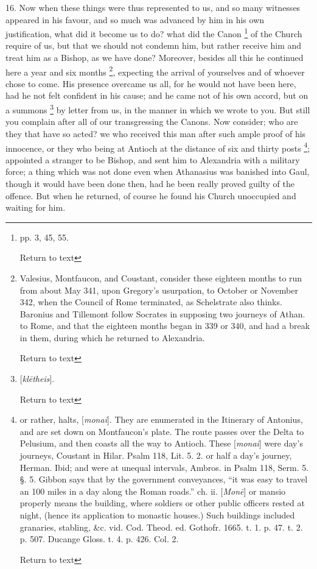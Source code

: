 16. Now when these things were thus represented
to us, and so many witnesses appeared in his favour, and so much was
advanced by him in his own justification, what did it become us to do?
what did the Canon \footnote{pp. 3, 45, 55.

Return to text}
of the Church require of us, but that we should not condemn him, but
rather receive him and treat him as a Bishop, as we have done?
Moreover, besides all this he continued here a year and six months \footnote{Valesius, Montfaucon, and Coustant, consider these eighteen months to
run from about May 341, upon Gregory's usurpation, to October or
November 342, when the Council of Rome terminated, as Schelstrate also
thinks. Baronius and Tillemont follow Socrates in supposing two
journeys of Athan. to Rome, and that the eighteen months began in 339
or 340, and had a break in them, during which he returned to
Alexandria.

Return to text}, expecting the arrival of yourselves and of whoever chose to
come. His presence overcame us all, for he would not have been here,
had he not felt confident in his cause; and he came not of his own
accord, but on a summons \footnote{[\emph{kl\={e}theis}].

Return to text}
by letter from us, in the manner in which we wrote to you. But
still you complain after all of our transgressing the Canons. Now
consider; who are they that have so acted? we who received this man
after such ample proof of his innocence, or they who being at Antioch
at the distance of six and thirty posts \footnote{or rather, halts, [\emph{monai}]. They are enumerated in the Itinerary
of Antonius, and are set down on Montfaucon's plate. The route passes
over the Delta to Pelusium, and then coasts all the way to Antioch.
These [\emph{monai}] were day's journeys, Coustant in Hilar. Psalm
118, Lit. 5. 2. or half a day's journey, Herman. Ibid; and were at
unequal intervals, Ambros. in Psalm 118, Serm. 5. §. 5. Gibbon says
that by the government conveyances, ``it was easy to travel an 100
miles in a day along the Roman roads.'' ch. ii. [\emph{Mon\={e}}] or
mansio properly means the building, where soldiers or other public
officers rested at night, (hence its application to monastic houses.)
Such buildings included granaries, stabling, \&c. vid. Cod. Theod.
ed. Gothofr. 1665. t. 1. p. 47. t. 2. p. 507. Ducange Gloss. t. 4. p.
426. Col. 2.

Return to text}; appointed a stranger to be Bishop, and sent him to Alexandria
with a military force; a thing which was not done even when Athanasius
was banished into Gaul, though it would have been done then, had he
been really proved guilty of the offence. But when he returned, of
course he found his Church unoccupied and waiting for him.

